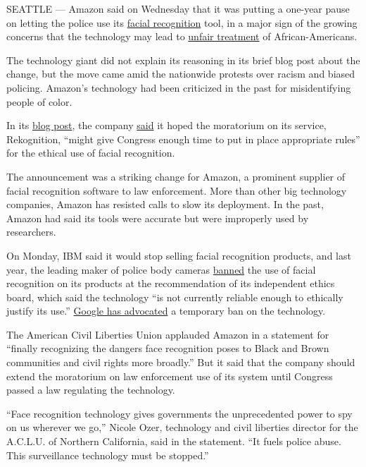 SEATTLE --- Amazon said on Wednesday that it was putting a one-year
pause on letting the police use its
\href{https://www.nytimes.com/2019/05/20/technology/amazon-facial-recognition.html}{facial
recognition} tool, in a major sign of the growing concerns that the
technology may lead to
\href{https://www.nytimes.com/2018/02/09/technology/facial-recognition-race-artificial-intelligence.html}{unfair
treatment} of African-Americans.

The technology giant did not explain its reasoning in its brief blog
post about the change, but the move came amid the nationwide protests
over racism and biased policing. Amazon's technology had been criticized
in the past for misidentifying people of color.

In its
\href{https://blog.aboutamazon.com/policy/we-are-implementing-a-one-year-moratorium-on-police-use-of-rekognition}{blog
post}, the company
\href{https://blog.aboutamazon.com/policy/we-are-implementing-a-one-year-moratorium-on-police-use-of-rekognition}{said}
it hoped the moratorium on its service, Rekognition, ``might give
Congress enough time to put in place appropriate rules'' for the ethical
use of facial recognition.

The announcement was a striking change for Amazon, a prominent supplier
of facial recognition software to law enforcement. More than other big
technology companies, Amazon has resisted calls to slow its deployment.
In the past, Amazon had said its tools were accurate but were improperly
used by researchers.

On Monday, IBM said it would stop selling facial recognition products,
and last year, the leading maker of police body cameras
\href{https://www.nytimes.com/2019/06/27/opinion/police-cam-facial-recognition.html}{banned}
the use of facial recognition on its products at the recommendation of
its independent ethics board, which said the technology ``is not
currently reliable enough to ethically justify its use.''
\href{https://www.nytimes.com/2020/06/09/technology/facial-recognition-software.html}{Google
has advocated} a temporary ban on the technology.

The American Civil Liberties Union applauded Amazon in a statement for
``finally recognizing the dangers face recognition poses to Black and
Brown communities and civil rights more broadly.'' But it said that the
company should extend the moratorium on law enforcement use of its
system until Congress passed a law regulating the technology.

``Face recognition technology gives governments the unprecedented power
to spy on us wherever we go,'' Nicole Ozer, technology and civil
liberties director for the A.C.L.U. of Northern California, said in the
statement. ``It fuels police abuse. This surveillance technology must be
stopped.''

